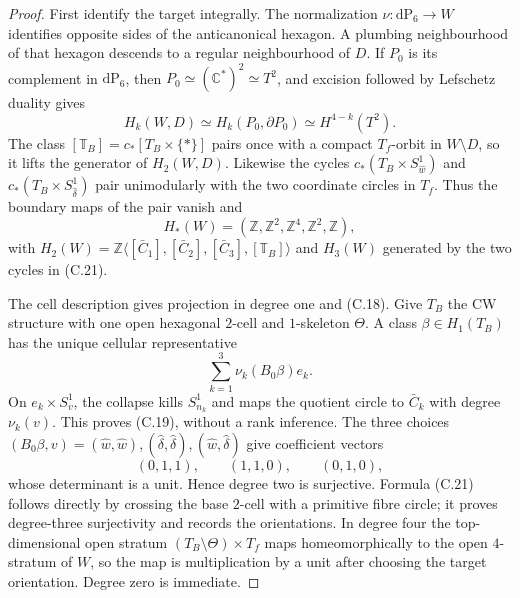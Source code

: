 \begin{proof}
First identify the target integrally.  The normalization
$\nu:\mathrm{dP}_6\to W$ identifies opposite sides of the anticanonical
hexagon.  A plumbing neighbourhood of that hexagon descends to a regular
neighbourhood of $D$.  If $P_0$ is its complement in $\mathrm{dP}_6$, then
$P_0\simeq(\mathbb C^*)^2\simeq T^2$, and excision followed by Lefschetz
duality gives
\[
 H_k(W,D)\simeq H_k(P_0,\partial P_0)
 \simeq H^{4-k}(T^2).
\tag{C.22}
\]
The class $[\mathbb T_B]=c_*[T_B\times\{*\}]$ pairs once with a compact
$T_f$-orbit in $W\setminus D$, so it lifts the generator of $H_2(W,D)$.
Likewise the cycles $c_*(T_B\times S^1_{\widehat w})$ and
$c_*(T_B\times S^1_{\widehat\delta})$ pair unimodularly with the two
coordinate circles in $T_f$.  Thus the boundary maps of the pair vanish and
\[
 H_*(W)=(\mathbb Z,\mathbb Z^2,\mathbb Z^4,\mathbb Z^2,\mathbb Z),
\tag{C.23}
\]
with
$H_2(W)=\mathbb Z\langle[\bar C_1],[\bar C_2],[\bar C_3],
[\mathbb T_B]\rangle$ and $H_3(W)$ generated by the two cycles in (C.21).

The cell description gives projection in degree one and (C.18).  Give $T_B$
the CW structure with one open hexagonal $2$-cell and $1$-skeleton $\Theta$.
A class $\beta\in H_1(T_B)$ has the unique cellular representative
\[
 \sum_{k=1}^3\nu_k(B_0\beta)e_k.
\]
On $e_k\times S^1_v$, the collapse kills $S^1_{n_k}$ and maps the quotient
circle to $\bar C_k$ with degree $\nu_k(v)$.  This proves (C.19), without a
rank inference.  The three choices
$(B_0\beta,v)=(\widehat w,\widehat w),
(\widehat\delta,\widehat\delta),(\widehat w,\widehat\delta)$ give coefficient
vectors
\[
 (0,1,1),\qquad(1,1,0),\qquad(0,1,0),
\]
whose determinant is a unit.  Hence degree two is surjective.  Formula
(C.21) follows directly by crossing the base $2$-cell with a primitive fibre
circle; it proves degree-three surjectivity and records the orientations.
 In degree four the top-dimensional open stratum
$(T_B\setminus\Theta)\times T_f$ maps homeomorphically to the open
$4$-stratum of $W$, so the map is multiplication by a unit after choosing the
target orientation.  Degree zero is immediate.


\end{proof}
